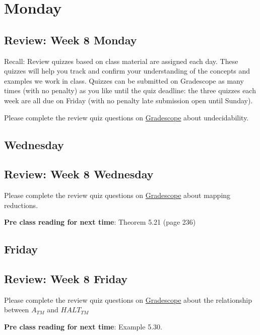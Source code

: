 

\section*{Monday}


    
\newpage
\subsection*{Review: Week 8 Monday}


Recall: Review quizzes based on class material are assigned each day. 
These quizzes will help you track and confirm your understanding of the concepts and examples 
we work in class. Quizzes can be submitted on Gradescope as many times (with no penalty) as 
you like until the quiz deadline: the three quizzes each week are all due on Friday (with no penalty 
late submission open until Sunday).

Please complete the review quiz questions on \href{http://gradescope.com}{Gradescope} about 
undecidability.

\newpage
\subsection*{Wednesday}



\subsection*{Review: Week 8 Wednesday}

Please complete the review quiz questions on \href{http://gradescope.com}{Gradescope} about 
mapping reductions.

{\bf Pre class reading for next time}: Theorem 5.21 (page 236)



\newpage
\subsection*{Friday}



\newpage
\subsection*{Review: Week 8 Friday}


Please complete the review quiz questions on \href{http://gradescope.com}{Gradescope} about 
the relationship between $A_{TM}$ and $HALT_{TM}$

{\bf Pre class reading for next time}: Example 5.30.


